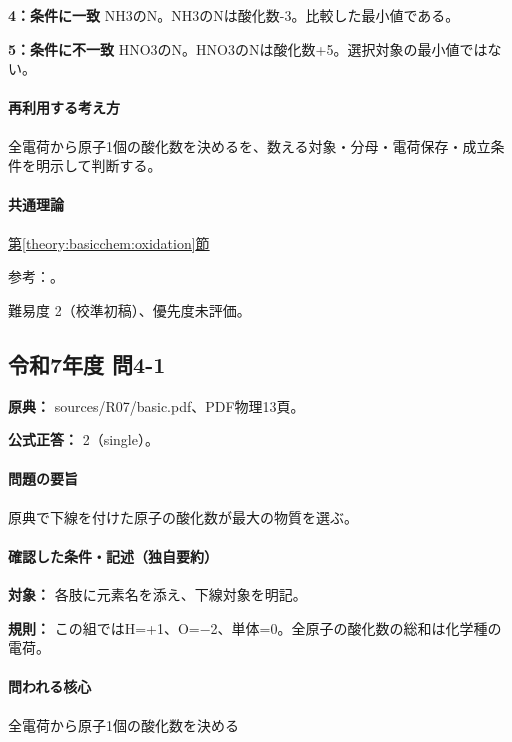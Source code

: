 \noindent\textbf{4：条件に一致} NH3のN。NH3のNは酸化数-3。比較した最小値である。\par

\noindent\textbf{5：条件に不一致} HNO3のN。HNO3のNは酸化数+5。選択対象の最小値ではない。\par

\paragraph{再利用する考え方} 全電荷から原子1個の酸化数を決めるを、数える対象・分母・電荷保存・成立条件を明示して判断する。

\paragraph{共通理論} \hyperref[theory:basicchem:oxidation]{第\ref*{theory:basicchem:oxidation}節}

\par 参考：\cite{iupac_oxidation_state}。

\par 難易度 2（校準初稿）、優先度未評価。

\subsection{令和7年度 問4-1}
\label{q:r07-reg-basic-4-1}

\noindent\textbf{原典：} sources/R07/basic.pdf、PDF物理13頁。

\textbf{公式正答：} 2（single）。

\paragraph{問題の要旨} 原典で下線を付けた原子の酸化数が最大の物質を選ぶ。

\paragraph{確認した条件・記述（独自要約）}\mbox{}\par

\noindent\textbf{対象：} 各肢に元素名を添え、下線対象を明記。\par

\noindent\textbf{規則：} この組ではH=+1、O=−2、単体=0。全原子の酸化数の総和は化学種の電荷。\par

\paragraph{問われる核心} 全電荷から原子1個の酸化数を決める


